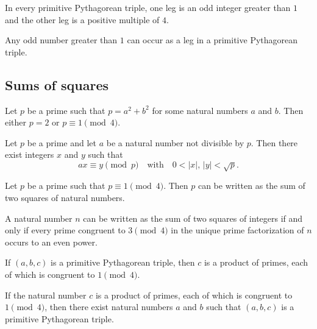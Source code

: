 \documentclass{article}
\theoremstyle{definition}
\newenvironment{manualtheorem}[1]{%
  \renewcommand{\thetheorem}{#1}%
  \theorem%
}{%
  \endtheorem%
}
\begin{document}
\begin{manualtheorem}{8.10}
	In every primitive Pythagorean triple, one leg is an odd integer greater than $1$
	and the other leg is a positive multiple of $4$.
\end{manualtheorem}

\begin{manualtheorem}{8.11}
	Any odd number greater than $1$ can occur as a leg in a primitive Pythagorean triple.
\end{manualtheorem}

\subsection{Sums of squares}

\begin{manualtheorem}{8.14}
	Let $p$ be a prime such that $p = a^{2} + b^{2}$ for some natural numbers $a$ and $b$. Then either $p = 2$ or $p \equiv 1 \pmod{4}$.
\end{manualtheorem}

\begin{manualtheorem}{8.15}
	Let $p$ be a prime and let $a$ be a natural number not divisible by $p$. Then there exist integers $x$ and $y$ such that
	\[
		ax \equiv y \pmod{p}
		\quad\text{with}\quad
		0 < |x|,\,|y| < \sqrt{p}.
	\]
\end{manualtheorem}

\begin{manualtheorem}{8.16}
	Let $p$ be a prime such that $p \equiv 1 \pmod{4}$. Then $p$ can be written as the sum of two squares of natural numbers.
\end{manualtheorem}

\begin{manualtheorem}{8.21}
	A natural number $n$ can be written as the sum of two squares of integers
	if and only if every prime congruent to $3 \pmod{4}$ in the unique prime
	factorization of $n$ occurs to an even power.
\end{manualtheorem}

\begin{manualtheorem}{8.22}
	If $(a,b,c)$ is a primitive Pythagorean triple, then $c$ is a product of primes, each of which is congruent to $1 \pmod{4}$.
\end{manualtheorem}

\begin{manualtheorem}{8.23}
	If the natural number $c$ is a product of primes, each of which is congruent to $1 \pmod{4}$, then there exist natural numbers $a$ and $b$ such that $(a,b,c)$ is a primitive Pythagorean triple.
\end{manualtheorem}
\end{document}
